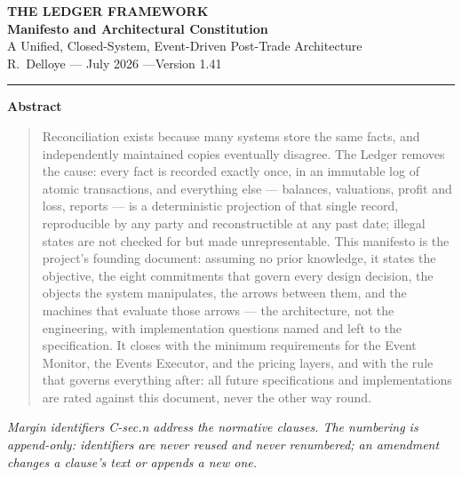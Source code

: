 \documentclass[11pt,a4paper]{article}
\begin{document}
\begin{center}
  {\LARGE\bfseries THE LEDGER FRAMEWORK}\\[0.9em]
  {\large\bfseries Manifesto and Architectural Constitution}\\[0.6em]
  {\normalsize A Unified, Closed-System, Event-Driven Post-Trade Architecture}\\[1.4em]
  R.~Delloye \quad--- July 2026 \quad---\quad Version 1.41
\end{center}

\vspace{0.6em}
\begin{center}\rule{0.35\linewidth}{0.4pt}\end{center}
\vspace{0.6em}

\begin{center}\textbf{Abstract}\end{center}
\begin{quote}
Reconciliation exists because many systems store the same facts, and
independently maintained copies eventually disagree. The Ledger removes
the cause: every fact is recorded exactly once, in an immutable log of
atomic transactions, and everything else --- balances, valuations,
profit and loss, reports --- is a deterministic projection of that
single record, reproducible by any party and reconstructible at any past
date; illegal states are not checked for but made unrepresentable. This
manifesto is the project's founding document: assuming no prior
knowledge, it states the objective, the eight commitments that govern every design
decision, the objects the system manipulates, the arrows
between them, and the machines that evaluate those arrows --- the
architecture, not the engineering, with implementation questions named
and left to the specification. It closes with the minimum requirements
for the Event Monitor, the Events Executor, and the pricing layers, and
with the rule that governs everything after: all future specifications
and implementations are rated against this document, never the other way
round.
\end{quote}

\begin{center}\small\itshape
Margin identifiers C-\emph{sec}.\emph{n} address the normative clauses.
The numbering is append-only: identifiers are never reused and never
renumbered; an amendment changes a clause's text or appends a new one.
\end{center}
\end{document}
